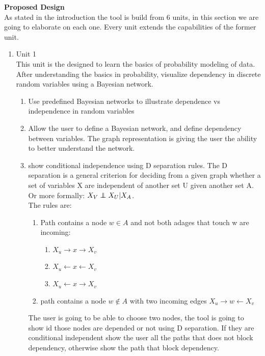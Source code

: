 \documentclass{article}
\newcommand\independent{\protect\mathpalette{\protect\independenT}{\perp}}
\def\independenT#1#2{\mathrel{\rlap{$#1#2$}\mkern2mu{#1#2}}}
\begin{document}
    \textbf{Proposed Design}\\
    As stated in the introduction the tool is build from 6 units, in this section we are going to elaborate on each one. Every unit extends the capabilities of the former unit.
    \begin{enumerate}
        \item Unit 1\\
        This unit is the designed to learn the basics of probability modeling of data. After understanding the basics in probability, visualize
        dependency in discrete random variables using a Bayesian network.
        \begin{enumerate}
            \item Use predefined Bayesian networks to illustrate dependence vs independence in random variables
            \item Allow the user to define a Bayesian network, and define dependency between variables. The graph representation is giving the user the ability to better understand the network.
            \item show conditional independence using D separation rules. The D separation is a general criterion for deciding from a given graph whether a set of variables X are independent of another set U given another set A. Or more formally: $X_V \independent X_U | X_A$.\\The rules are:\\
            \begin{enumerate}
                \item Path contains a node $w \in A$ and not both adages that touch w are incoming:
                \begin{enumerate}
                    \item $X_u \rightarrow x \rightarrow X_v$
                    \item $X_u \leftarrow x \leftarrow X_v$
                    \item $X_u \leftarrow x \rightarrow X_v$
                \end{enumerate}
                \item path contains a node $w\notin A$ with two incoming edges $X_u \rightarrow w \leftarrow X_v$
            \end{enumerate}
            The user is going to be able to choose two nodes, the tool is going to show id those nodes are depended or not using D separation. If they are conditional
            independent show the user all the paths that does not block dependency, otherwise show the path that block dependency.\\
        \end{enumerate}


\end{enumerate}
\end{document}
